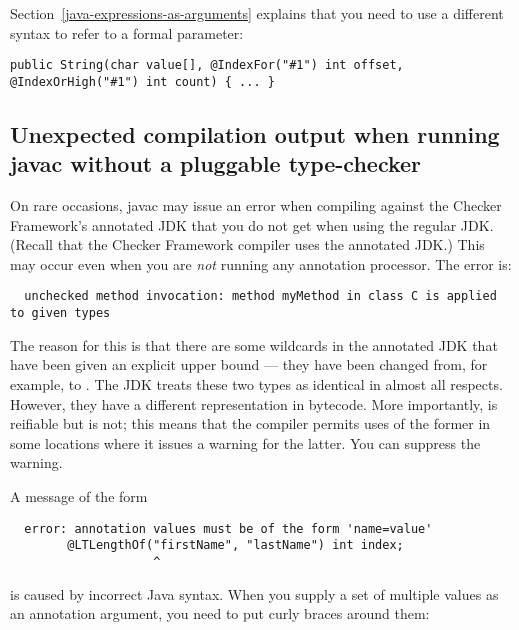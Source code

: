 \begin{itemize}
Section~\ref{java-expressions-as-arguments} explains that you need to use
a different syntax to refer to a formal parameter:

\begin{smaller}
\begin{Verbatim}
public String(char value[], @IndexFor("#1") int offset, @IndexOrHigh("#1") int count) { ... }
\end{Verbatim}
\end{smaller}


\end{itemize}


\subsection{Unexpected compilation output when running javac without a pluggable type-checker\label{common-problems-running-javac}}

On rare occasions, javac may issue an error when compiling against the
Checker Framework's annotated JDK that you do not get when using the
regular JDK\@.  (Recall that the Checker Framework compiler uses the
annotated JDK\@.)  This may occur even when you are \emph{not} running any
annotation processor.  The error is:

\begin{Verbatim}
  unchecked method invocation: method myMethod in class C is applied to given types
\end{Verbatim}

The reason for this is that there are some wildcards in the annotated JDK
that have been given an explicit upper bound --- they have been changed
from, for example,  to .  The
JDK treats these two types as identical in almost all respects.  However,
they have a different representation in bytecode.  More importantly,
 is reifiable but  is not; this
means that the compiler permits uses of the former in some locations where
it issues a warning for the latter.  You can suppress the warning.

A message of the form

\begin{Verbatim}
  error: annotation values must be of the form 'name=value'
        @LTLengthOf("firstName", "lastName") int index;
                    ^
\end{Verbatim}

\noindent
is caused by incorrect Java syntax.  When you supply a set of multiple
values as an annotation argument, you need to put curly braces around them:

